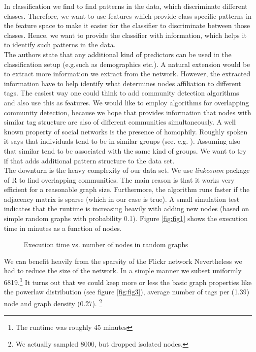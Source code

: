 \documentclass[11pt,letterpaper]{article}
\begin{document}
In classification we find to find patterns in the data, which discriminate different classes. Therefore, we want to use features which provide class specific patterns in the feature space to make it easier for the classifier to discriminate between those classes. Hence, we want to provide the classifier with information, which helps it to identify such patterns in the data.\\
The authors state that any additional kind of predictors can be used in the classification setup (e.g.such as demographics etc.). A natural extension would be to extract more information we extract from the network. However, the extracted information have to help identify what determines nodes affiliation to different tags. The easiest way one could think to add community detection algorithms and also use this as features. We would like to employ algorithms for overlapping community detection, because we hope that provides information that nodes with similar tag structure are also of different communities simultaneously. A well known property of social networks is the presence of homophily. Roughly spoken it says that individuals tend to be in similar groups (see. e.g. \cite{Mcpherson2016}). Assuming also that similar tend to be associated with the same kind of groups. We want to try if that adds additional pattern structure to the data set.\\ 
The downturn is the heavy complexity of our data set. We use \textit{linkcomm} package of R to find overlapping communities. The main reason is that it works very efficient for a reasonable graph size. Furthermore, the algorithm runs faster if the adjacency matrix is sparse (which in our case is true). A small simulation test indicates that the runtime is increasing heavily with adding new nodes (based on simple random graphs with probability 0.1). Figure \ref{fig:fig1} shows the execution time in minutes as a function of nodes. 

\begin{figure}[H]
	
	\caption{Execution time vs. number of nodes in random graphs}
	\label{fig:fig2}
\end{figure}

We can benefit heavily from the sparsity of the Flickr network  Nevertheless we had to reduce the size of the network. In a simple manner we subset uniformly 6819.\footnote{The runtime was roughly 45 minutes} It turns out that we could keep more or less the basic graph properties like the powerlaw distribution (see figure \ref{fig:fig3}), average number of tags per (1.39) node and graph density (0.27). \footnote{We actually sampled 8000, but dropped isolated nodes.}
\end{document}
